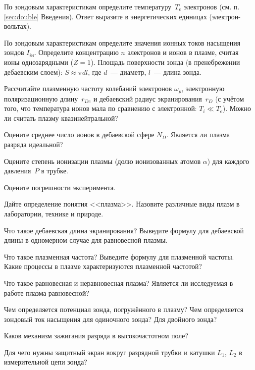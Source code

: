\begin{lab:task}
\item По зондовым характеристикам определите температуру~$T_e$ электронов
(см. п. \ref{sec:double} Введения). Ответ
выразите в энергетических единицах (электрон-вольтах).

\item По зондовым характеристикам определите значения ионных токов насыщения
зондов $I_{iн}$. 
Определите концентрацию $n$ электронов и ионов в плазме, 
считая ионы однозарядными ($Z=1$).
Площадь поверхности зонда (в пренебрежении
дебаевским слоем): $S\approx \pi d l$, где 
$d$~--- диаметр, $l$~--- длина зонда.

\item Рассчитайте плазменную частоту колебаний электронов $\omega_p$,
электронную поляризационную длину~$r_{De}$ и дебаевский радиус экранирования~$r_D$
(с учётом того, что температура ионов мала по сравнению с электронной: $T_i\ll T_e$). 
Можно ли считать плазму квазинейтральной?

\item Оцените среднее число ионов в дебаевской сфере $N_D$. 
Является ли плазма разряда идеальной?

\item Оцените степень ионизации плазмы (долю ионизованных атомов $\alpha$)
для каждого давления~$P$ в трубке.

\item Оцените погрешности эксперимента.

\end{lab:task}

\begin{lab:questions}
    \item Дайте определение понятия <<плазма>>. Назовите различные виды плазм в лаборатории, 
    технике и природе.
    
    \item Что такое дебаевская длина экранирования? Выведите формулу
    для дебаевской длины в одномерном случае для равновесной плазмы.
    
    \item Что такое плазменная частота? Выведите формулу для плазменной частоты.
    Какие процессы в плазме характеризуются плазменной частотой?

    \item Что такое равновесная и неравновесная плазма? 
    Является ли исследуемая в работе плазма равновесной?
        
    \item Чем определяется потенциал зонда, погружённого в плазму? 
    Чем определяется зондовый ток насыщения для одиночного зонда? Для двойного
    зонда?
    
    \item Каков механизм зажигания разряда в высокочастотном поле?
    
    \item Для чего нужны защитный экран вокруг разрядной трубки и катушки $L_1$, $L_2$ в измерительной
    цепи зонда?
\end{lab:questions}


